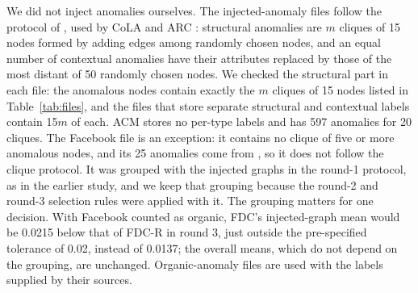 \documentclass[pdflatex,sn-mathphys-ay]{sn-jnl}
\theoremstyle{plain}
\theoremstyle{remark}
\begin{document}
\begin{appendices}
We did not inject anomalies ourselves. The injected-anomaly files follow the protocol of \citet{ding2019deep}, used by CoLA and ARC \citep{liu2021cola,liu2024arc}: structural anomalies are $m$ cliques of 15 nodes formed by adding edges among randomly chosen nodes, and an equal number of contextual anomalies have their attributes replaced by those of the most distant of 50 randomly chosen nodes. We checked the structural part in each file: the anomalous nodes contain exactly the $m$ cliques of 15 nodes listed in Table~\ref{tab:files}, and the files that store separate structural and contextual labels contain 15$m$ of each. ACM stores no per-type labels and has 597 anomalies for 20 cliques. The Facebook file is an exception: it contains no clique of five or more anomalous nodes, and its 25 anomalies come from \citet{xu2022contrastive}, so it does not follow the clique protocol. It was grouped with the injected graphs in the round-1 protocol, as in the earlier study, and we keep that grouping because the round-2 and round-3 selection rules were applied with it. The grouping matters for one decision. With Facebook counted as organic, FDC's injected-graph mean would be 0.0215 below that of FDC-R in round 3, just outside the pre-specified tolerance of 0.02, instead of 0.0137; the overall means, which do not depend on the grouping, are unchanged. Organic-anomaly files are used with the labels supplied by their sources.


\end{appendices}
\end{document}
